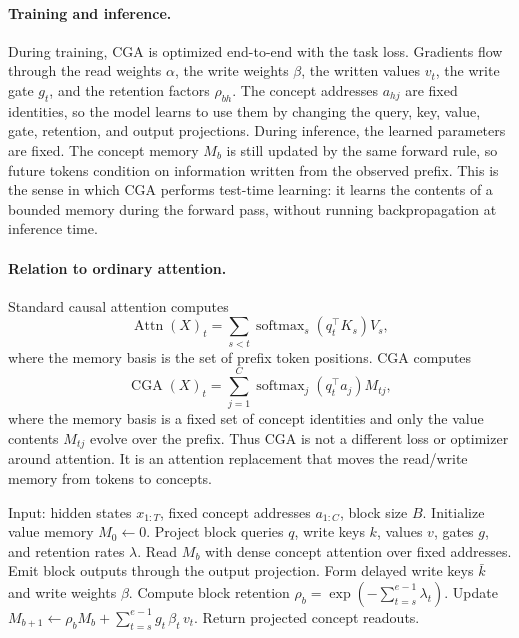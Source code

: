 \paragraph{Training and inference.}
During training, CGA is optimized end-to-end with the task loss. Gradients flow through the read weights $\alpha$, the write weights $\beta$, the written values $v_t$, the write gate $g_t$, and the retention factors $\rho_{bh}$. The concept addresses $a_{hj}$ are fixed identities, so the model learns to use them by changing the query, key, value, gate, retention, and output projections. During inference, the learned parameters are fixed. The concept memory $M_b$ is still updated by the same forward rule, so future tokens condition on information written from the observed prefix. This is the sense in which CGA performs test-time learning: it learns the contents of a bounded memory during the forward pass, without running backpropagation at inference time.

\paragraph{Relation to ordinary attention.}
Standard causal attention computes
\[
\operatorname{Attn}(X)_t
=
\sum_{s<t}
\operatorname{softmax}_s(q_t^\top K_s)V_s,
\]
where the memory basis is the set of prefix token positions. CGA computes
\[
\operatorname{CGA}(X)_t
=
\sum_{j=1}^{C}
\operatorname{softmax}_j(q_t^\top a_j)M_{tj},
\]
where the memory basis is a fixed set of concept identities and only the value contents $M_{tj}$ evolve over the prefix. Thus CGA is not a different loss or optimizer around attention. It is an attention replacement that moves the read/write memory from tokens to concepts.

\begin{algorithm}[t]
\caption{\textsc{ConceptGraphAttentionForward}}
\label{alg:main-cga}
\begin{algorithmic}[1]
\Statex Input: hidden states $x_{1:T}$, fixed concept addresses
$a_{1:C}$, block size $B$.
\State Initialize value memory $M_0\gets0$.
\For{causal blocks $b=[s,e)$}
    \State Project block queries $q$, write keys $k$, values $v$, gates $g$,
    and retention rates $\lambda$.
    \State Read $M_b$ with dense concept attention over fixed addresses.
    \State Emit block outputs through the output projection.
    \State Form delayed write keys $\bar k$ and write weights $\beta$.
    \State Compute block retention
    $\rho_b=\exp(-\sum_{t=s}^{e-1}\lambda_t)$.
    \State Update
    $M_{b+1}\gets \rho_b M_b+\sum_{t=s}^{e-1}g_t\,\beta_t\,v_t$.
\EndFor
\State Return projected concept readouts.
\end{algorithmic}
\end{algorithm}

